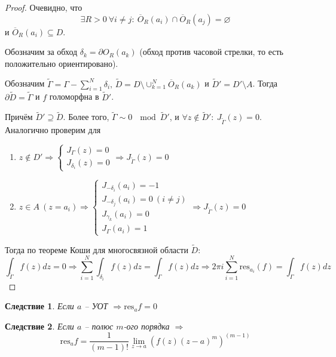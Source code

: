 \documentclass[a4paper,12pt]{article}
\renewcommand{\emptyset}{\ensuremath{\varnothing}}
\theoremstyle{plain}
\newtheorem*{corollary}{Следствие}
\theoremstyle{definition}
\theoremstyle{remark}
\begin{document}
\begin{proof}
	Очевидно, что
	\[
		\exists R > 0 \: \forall i \neq j :\: \overline{O}_R(a_i) \cap \overline{O}_R(a_j) = \emptyset
	\]
	и $\overline{O}_R(a_i) \subseteq D$.

	Обозначим за обход $\delta_k = \partial O_R(a_k)$ (обход против часовой стрелки, то есть положительно ориентировано).

	Обозначим $\tilde{\Gamma} = \Gamma - \sum_{i = 1}^N \delta_i,\, \tilde{D} = D \setminus \cup_{k = 1}^N \overline{O}_R(a_k)$ и $\tilde{D}' = D'
		\setminus A$. Тогда $\partial\tilde{D} = \tilde{\Gamma}$ и $f$ голоморфна в $\tilde{D}'$.

	Причём $\tilde{D}' \supseteq \tilde{D}$. Более того, $\tilde{\Gamma} \sim 0 \: \mod \tilde{D}'$, и $\forall z \not\in \tilde{D}' :\: J_{\tilde{\Gamma}}(z) = 0$. Аналогично проверим для
	\begin{enumerate}
		\item $z \not\in D' \Rightarrow \begin{cases}
				      J_\Gamma(z) = 0 \\
				      J_{\delta_i}(z) = 0
			      \end{cases} \Rightarrow J_{\tilde{\Gamma}}(z) = 0$
		\item $z \in A \: (z = a_i) \Rightarrow \begin{cases}
				      J_{-\delta_i}(a_i) = -1              \\
				      J_{-\delta_j}(a_i) = 0 \: (i \neq j) \\
				      J_{\gamma_k}(a_i) = 0                \\
				      J_\Gamma(a_i) = 1
			      \end{cases} \Rightarrow J_{\tilde{\Gamma}}(z) = 0$
	\end{enumerate}
	Тогда по теореме Коши для многосвязной области $\tilde{D}$:
	\[
		\int_{\tilde{\Gamma}} f(z)dz = 0 \Rightarrow \sum_{i = 1}^N\int_{\delta_i}f(z)dz = \int_\Gamma f(z)dz \Rightarrow 2\pi i\sum_{i = 1}^N\text{res}_{a_i}(f) = \int_\Gamma f(z)dz
	\]
\end{proof}

\begin{corollary}
	Если $a$ -- УОТ $\Rightarrow \text{res}_af = 0$
\end{corollary}

\begin{corollary}
	Если $a$ -- полюс $m$-ого порядка $\Rightarrow$
	\[
		\text{res}_af = \frac{1}{(m - 1)!}\lim_{z \to a}\left(f(z)(z - a)^m\right)^{(m - 1)}
	\]
\end{corollary}
\end{document}
